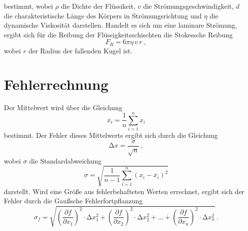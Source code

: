 bestimmt, wobei $\rho$ die Dichte der Flüssikeit, $v$ die Strömungsgeschwindigkeit,
$d$ die charakteristische Länge des Körpers in Strömungsrichtung und $\eta$ die dynamische Viskosität
darstellen.
\newline
\newline
Handelt es sich um eine laminare Strömung, ergibt sich für die Reibung der
Flüssigkeitsschischten die Stokessche Reibung
\begin{equation}
  \label{eqn:stokes}
  F_R = 6 \pi \eta \, v \,r \; ,
\end{equation}
wobei $r$ der Radius der fallenden Kugel ist.

\section{Fehlerrechnung}
Der Mittelwert wird über die Gleichung
\begin{equation}
  \label{eqn:MW}
   \overline{x_i} = \frac{1}{n} \sum_{i=1}^n  x_i
\end{equation}
bestimmt.
\newline
Der Fehler dieses Mittelwerts ergibt sich durch die Gleichung
\begin{equation}
  \label{eqn:MF}
  \increment{x}=\frac{\sigma}{\sqrt{n}}\, ,
\end{equation}
wobei $\sigma$ die Standardabweichung
\begin{equation}
  \sigma = \sqrt{\frac{1}{n-1}\sum_{i=1}^n (x_i-\overline{x_i})^2}
\end{equation}
darstellt.
\newline
Wird eine Größe aus fehlerbehafteten Werten errechnet, ergibt sich der Fehler durch
die Gaußsche Fehlerfortpflanzung
\begin{equation}
  \label{eqn:gauß}
  \sigma_f = \sqrt{\left(\frac{\partial f}{\partial x_1}\right)^2\cdot \increment x_1^2
  + \left(\frac{\partial f}{\partial x_2}\right)^2\cdot \increment x_2^2 + ...
  + \left(\frac{\partial f}{\partial x_n}\right)^2\cdot \increment x_n^2 } \, .
\end{equation}
